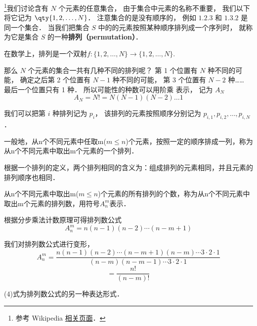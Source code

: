 


\footnote{参考 Wikipedia \href{https://en.wikipedia.org/wiki/Permutation}{相关页面}．}我们讨论含有 $N$ 个元素的任意集合， 由于集合中元素的名称不重要， 我们以下将它记为 $\qty{1,2,\dots, N}$． 注意集合的是没有顺序的， 例如 $\qty{1,2,3}$ 和 $\qty{1,3,2}$ 是同一个集合． 当我们把集合 $S$ 中的的元素按照某种顺序排列成一个序列时， 就称为它是集合 $S$ 的一种\textbf{排列（permutation）}．

在数学上，排列是一个双射$f:\{1,2,\dots,N\}\rightarrow\{1,2,\dots,N\}$.

那么 $N$ 个元素的集合一共有几种不同的排列呢？ 第 1 个位置有 $N$ 种不同的可能， 确定之后第 2 个位置有 $N-1$ 种不同的可能， 第 3 个位置有 $N-2$ 种…… 最后一个位置只有 1 种． 所以可能性的种数可以用阶乘 表示， 记为 $A_N$
\begin{equation}
A_N = N! = N(N-1)(N-2)\dots 1
\end{equation}

我们可以把第 $i$ 种排列记为 $p_i$， 该排列的元素按照顺序分别记为 $p_{i,1}, p_{i,2}, \dots, p_{i,N}$．

一般地，从n个不同元素中任取m($m \leq n$)个元素，按照一定的顺序排成一列，称为从n个不同元素中取出m个元素的一个排列．

根据一个排列的定义，两个排列相同的含义为：组成排列的元素相同，并且元素的排列顺序也相同．

从n个不同元素中取出m($m \leq n$)个元素的所有排列的个数，称为从n个不同元素中取出m个元素的排列数，用符号$A_n^m$表示．

根据分步乘法计数原理可得排列数公式\begin{equation}
A_n^m = n (n - 1)(n - 2) \cdots (n - m + 1)
\end{equation}

我们对排列数公式进行变形，\begin{equation}
A_n^m = \frac{n(n - 1)(n - 2)\cdots	(n - m + 1)(n - m)\cdots 3\cdot 2 \cdot 1}{(n - m)(n - m -1)\cdots 3\cdot 2 \cdot 1}
\end{equation}
\begin{equation}
=\frac{n!}{(n - m)!}
\end{equation}

(4)式为排列数公式的另一种表达形式．